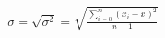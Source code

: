 \documentclass[10pt]{article}
\begin{document}
\begin{align*}\sigma = \sqrt{\sigma^2} = \sqrt{\frac{\sum\limits_{i=0}^n (x_i - \bar{x})^2}{n-1}}\end{align*}
\end{document}

